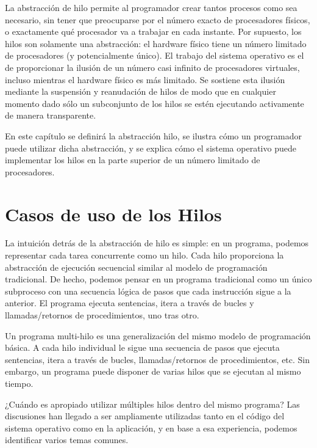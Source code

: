 \documentclass[10pt]{book}
\begin{document}
La abstracción de hilo permite al programador crear tantos procesos como sea necesario, sin tener que preocuparse por el número exacto de procesadores físicos, o exactamente qué procesador va a trabajar en cada instante. Por supuesto, los hilos son solamente una abstracción: el hardware físico tiene un número limitado de procesadores (y potencialmente único). El trabajo del sistema operativo es el de proporcionar la ilusión de un número casi infinito de procesadores virtuales, incluso mientras el hardware físico es más limitado. Se sostiene esta ilusión mediante la suspensión y reanudación de hilos de modo que en cualquier momento dado sólo un subconjunto de los hilos se estén ejecutando activamente de manera transparente.

En este capítulo se definirá la abstracción hilo, se ilustra cómo un programador puede utilizar dicha abstracción, y se explica cómo el sistema operativo puede implementar los hilos en la parte superior de un número limitado de procesadores.

\section{Casos de uso de los Hilos}
La intuición detrás de la abstracción de hilo es simple: en un programa, podemos representar cada tarea concurrente como un hilo. Cada hilo proporciona la abstracción de ejecución secuencial similar al modelo de programación tradicional. De hecho, podemos pensar en un programa tradicional como un único subproceso con una secuencia lógica de pasos que cada instrucción sigue a la anterior. El programa ejecuta sentencias, itera a través de bucles y llamadas/retornos de procedimientos, uno tras otro.

Un programa multi-hilo es una generalización del mismo modelo de programación básica. A cada hilo individual le sigue una secuencia de pasos que ejecuta sentencias, itera a través de bucles, llamadas/retornos de procedimientos, etc. Sin embargo, un programa puede disponer de varias hilos que se ejecutan al mismo tiempo.

¿Cuándo es apropiado utilizar múltiples hilos dentro del mismo programa? Las discusiones han llegado a ser ampliamente utilizadas tanto en el código del sistema operativo como en la aplicación, y en base a esa experiencia, podemos identificar varios temas comunes.
\end{document}
